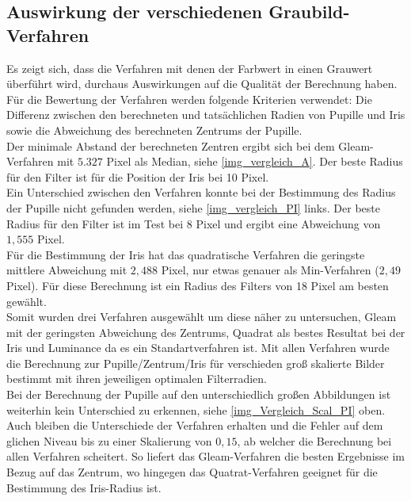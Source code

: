 \subsection{Auswirkung der verschiedenen Graubild-Verfahren}
\label{grau_Auswirkung_ElSe}
Es zeigt sich, dass die Verfahren mit denen der Farbwert in einen Grauwert überführt wird, durchaus Auswirkungen auf die Qualität der Berechnung haben.\\
Für die Bewertung der Verfahren werden folgende Kriterien verwendet: Die Differenz zwischen den berechneten und tatsächlichen Radien von Pupille und Iris sowie die Abweichung des berechneten Zentrums der Pupille.\\
Der minimale Abstand der berechneten Zentren ergibt sich bei dem Gleam-Verfahren mit $5.327$ Pixel als Median, siehe \autoref{img_vergleich_A}. Der beste Radius für den Filter ist für die Position der Iris bei 10 Pixel.\\
Ein Unterschied zwischen den Verfahren konnte bei der Bestimmung des Radius der Pupille nicht gefunden werden, siehe \autoref{img_vergleich_PI} links. Der beste Radius für den Filter ist im Test bei 8 Pixel und ergibt eine Abweichung von $1,555$ Pixel.\\
Für die Bestimmung der Iris hat das quadratische Verfahren die geringste mittlere Abweichung mit $2,488$ Pixel, nur etwas genauer als Min-Verfahren ($2,49$ Pixel). Für diese Berechnung ist ein Radius des Filters von 18 Pixel am besten gewählt.\\
Somit wurden drei Verfahren ausgewählt um diese näher zu untersuchen, Gleam mit der geringsten Abweichung des Zentrums, Quadrat als bestes Resultat bei der Iris und Luminance da es ein Standartverfahren ist. Mit allen Verfahren wurde die Berechnung zur Pupille/Zentrum/Iris für verschieden groß skalierte Bilder bestimmt mit ihren jeweiligen optimalen Filterradien.\\
Bei der Berechnung der Pupille auf den unterschiedlich großen Abbildungen ist weiterhin kein Unterschied zu erkennen, siehe \autoref{img_Vergleich_Scal_PI} oben.\\
Auch bleiben die Unterschiede der Verfahren erhalten und die Fehler auf dem glichen Niveau bis zu einer Skalierung von $0,15$, ab welcher die Berechnung bei allen Verfahren scheitert. So liefert das Gleam-Verfahren die besten Ergebnisse im Bezug auf das Zentrum, wo hingegen das Quatrat-Verfahren geeignet für die Bestimmung des Iris-Radius ist.
